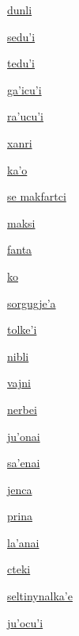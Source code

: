 {\hyperlink{val:dunli}{dunli}}{}{}{}

{\hyperlink{val:seduhi}{sedu'i}}{}{}{}

{\hyperlink{val:teduhi}{tedu'i}}{}{}{}

{\hyperlink{val:gahicuhi}{ga'icu'i}}{}{}{}

{\hyperlink{val:rahucuhi}{ra'ucu'i}}{}{}{}

{\hyperlink{val:xanri}{xanri}}{}{}{}

{\hyperlink{val:kaho}{ka'o}}{}{}{}

{\hyperlink{val:makfartci}{se makfartci}}{}{}{}

{\hyperlink{val:maksi}{maksi}}{}{}{}

{\hyperlink{val:fanta}{fanta}}{}{}{}

{\hyperlink{val:ko}{ko}}{}{}{}

{\hyperlink{val:sorgugjeha}{sorgugje'a}}{}{}{}

{\hyperlink{val:tolkehi}{tolke'i}}{}{}{}

{\hyperlink{val:nibli}{nibli}}{}{}{}

{\hyperlink{val:vajni}{vajni}}{}{}{}

{\hyperlink{val:nerbei}{nerbei}}{}{}{}

{\hyperlink{val:juhonai}{ju'onai}}{}{}{}

{\hyperlink{val:sahenai}{sa'enai}}{}{}{}

{\hyperlink{val:jenca}{jenca}}{}{}{}

{\hyperlink{val:prina}{prina}}{}{}{}

{\hyperlink{val:lahanai}{la'anai}}{}{}{}

{\hyperlink{val:cteki}{cteki}}{}{}{}

{\hyperlink{val:seltinynalkahe}{seltinynalka'e}}{}{}{}

{\hyperlink{val:juhocuhi}{ju'ocu'i}}{}{}{}

